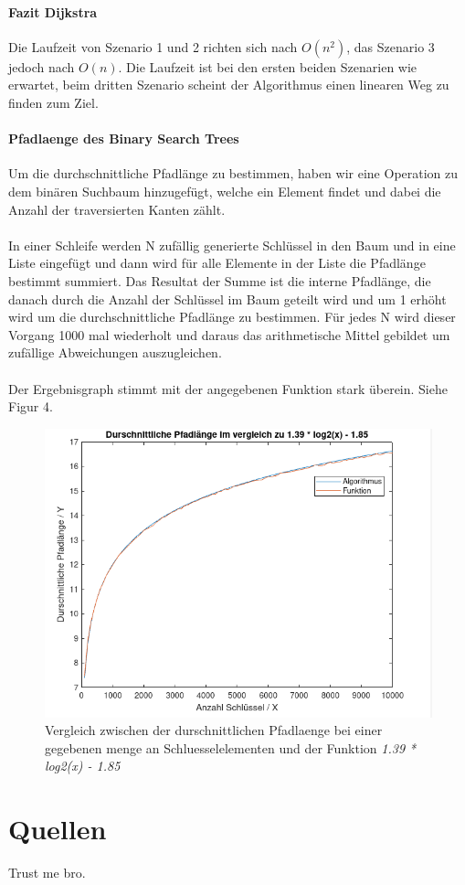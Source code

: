 \documentclass[utf8]{article}
\begin{document}
\paragraph{Fazit Dijkstra} Die Laufzeit von Szenario 1 und 2 richten sich nach
$O(n^2)$, das Szenario 3 jedoch nach $O(n)$. Die Laufzeit ist bei den ersten beiden
Szenarien wie erwartet, beim dritten Szenario scheint der Algorithmus einen
linearen Weg zu finden zum Ziel.

\paragraph{Pfadlaenge des Binary Search Trees}
Um die durchschnittliche Pfadlänge zu bestimmen, haben wir
eine Operation zu dem binären Suchbaum hinzugefügt, welche
ein Element findet und dabei die Anzahl der traversierten
Kanten zählt.\\\\
In einer Schleife werden N zufällig generierte Schlüssel in den Baum
und in eine Liste eingefügt und dann wird für alle Elemente in der
Liste die Pfadlänge bestimmt summiert. Das Resultat der Summe 
ist die interne Pfadlänge, die danach durch die Anzahl der Schlüssel
im Baum geteilt wird und um 1 erhöht wird um die durchschnittliche
Pfadlänge zu bestimmen. Für jedes N wird dieser Vorgang 1000 mal
wiederholt und daraus das arithmetische Mittel gebildet um
zufällige Abweichungen auszugleichen.\\\\
Der Ergebnisgraph stimmt mit der angegebenen
Funktion stark überein. Siehe Figur 4.

\begin{figure}[H]
  \centering
  \includegraphics[width=1\textwidth]{Images/Pfadlaenge.png}
  \caption[]{Vergleich zwischen der durschnittlichen Pfadlaenge bei einer
  gegebenen menge an Schluesselelementen und der Funktion \emph{1.39 * log2(x) - 1.85}}
\end{figure}

\section{Quellen}
Trust me bro.
\end{document}
